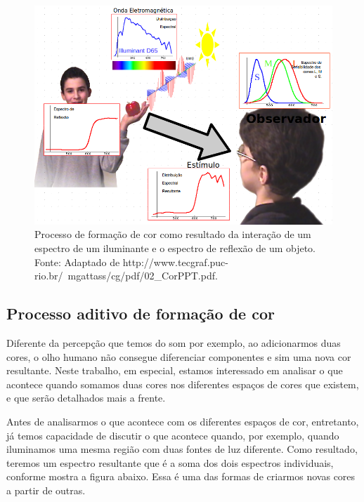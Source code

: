 \documentclass[a4paper,10pt]{report}
\begin{document}
\begin{figure}[!htb]
     \centering
     \includegraphics[scale=0.9]{img/what_is_color.png}
     \caption{Processo de formação de cor como resultado da interação de um
espectro de um iluminante e o espectro de reflexão de um objeto. Fonte:
Adaptado de 
{http://www.tecgraf.puc-rio.br/~mgattass/cg/pdf/02_CorPPT.pdf}.}
     \label{fig:what_is_color}
\end{figure}

\subsection{Processo aditivo de formação de cor}
\par
Diferente da percepção que temos do som por exemplo, ao adicionarmos duas cores,
o olho humano não consegue diferenciar componentes e sim uma nova cor
resultante. Neste trabalho, em especial, estamos interessado em analisar o que
acontece quando somamos duas cores nos diferentes espaços de cores que existem,
e que serão detalhados mais a frente.

\par
Antes de analisarmos o que acontece com os diferentes espaços de cor,
entretanto, já temos capacidade de discutir o que acontece quando, por exemplo,
quando iluminamos uma mesma região com duas fontes de luz diferente. Como
resultado, teremos um espectro resultante que é a soma dos dois espectros
individuais, conforme mostra a figura abaixo. Essa é uma das formas de criarmos
novas cores a partir de outras.
\end{document}
